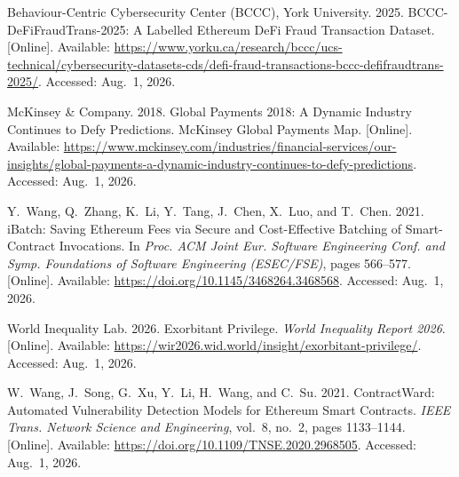 \documentclass[12pt,a4paper]{report}
\begin{document}
{\begin{enumerate}[label={[\arabic*]}]
\item Behaviour-Centric Cybersecurity Center (BCCC), York University. 2025. BCCC-DeFiFraudTrans-2025: A Labelled Ethereum DeFi Fraud Transaction Dataset. [Online]. Available: \url{https://www.yorku.ca/research/bccc/ucs-technical/cybersecurity-datasets-cds/defi-fraud-transactions-bccc-defifraudtrans-2025/}. Accessed: Aug.~1, 2026.


\item McKinsey \& Company. 2018. Global Payments 2018: A Dynamic Industry Continues to Defy Predictions. McKinsey Global Payments Map. [Online]. Available: \url{https://www.mckinsey.com/industries/financial-services/our-insights/global-payments-a-dynamic-industry-continues-to-defy-predictions}. Accessed: Aug.~1, 2026.

\item Y.~Wang, Q.~Zhang, K.~Li, Y.~Tang, J.~Chen, X.~Luo, and T.~Chen. 2021. iBatch: Saving Ethereum Fees via Secure and Cost-Effective Batching of Smart-Contract Invocations. In \emph{Proc. ACM Joint Eur. Software Engineering Conf. and Symp. Foundations of Software Engineering (ESEC/FSE)}, pages 566--577. [Online]. Available: \url{https://doi.org/10.1145/3468264.3468568}. Accessed: Aug.~1, 2026.

\item World Inequality Lab. 2026. Exorbitant Privilege. \emph{World Inequality Report 2026}. [Online]. Available: \url{https://wir2026.wid.world/insight/exorbitant-privilege/}. Accessed: Aug.~1, 2026.


\item W.~Wang, J.~Song, G.~Xu, Y.~Li, H.~Wang, and C.~Su. 2021. ContractWard: Automated Vulnerability Detection Models for Ethereum Smart Contracts. \emph{IEEE Trans. Network Science and Engineering}, vol.~8, no.~2, pages 1133--1144. [Online]. Available: \url{https://doi.org/10.1109/TNSE.2020.2968505}. Accessed: Aug.~1, 2026.


\end{enumerate}}
\end{document}
